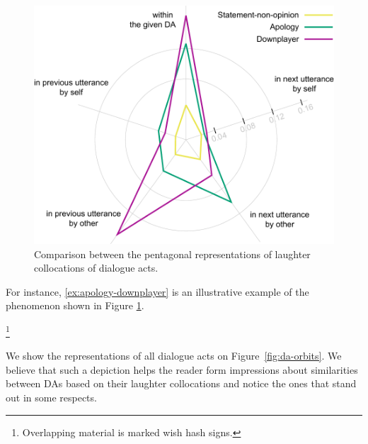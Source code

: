 \documentclass[11pt,a4paper]{article}
\begin{document}
\begin{figure}
  \includegraphics[width=\linewidth]{img/orbit-apology.pdf}
  \caption{Comparison between the pentagonal representations of laughter collocations of dialogue acts.}
  \label{fig:orbit}
\end{figure}



For instance, \ref{ex:apology-downplayer} is an illustrative example
of the phenomenon shown in Figure \ref{fig:orbit}.


\begin{lingex}%
\item\label{ex:apology-downplayer}\footnote{Overlapping material is marked wish hash signs.}
  \small
\end{lingex}

We show the representations of all dialogue acts on
Figure~\ref{fig:da-orbits}. We believe that such a depiction helps
the reader form impressions about similarities  between
DAs based on their laughter collocations and notice the ones
that stand out in some respects.
\end{document}
